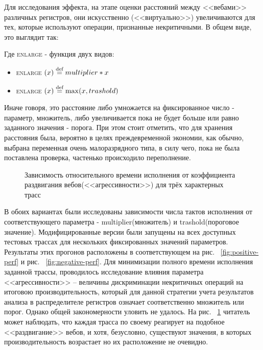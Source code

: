\documentclass[a4paper,12pt,titlepage]{article}
\newcommand*{\fig}[1]{рис. ~{\ref{fig:#1}}}
\begin{document}
Для исследования эффекта, на этапе оценки расстояний между <<вебами>> различных регистров, они искусственно (<<виртуально>>) увеличиваются для тех, которые используют операции, признанные некритичными. В общем виде, это выглядит так:
\begin{algorithmic}
\EndIf
\end{algorithmic}
Где \textsc{enlarge} - функция двух видов:
\begin{itemize}
	\item \textsc{enlarge} $( x ) \stackrel{\text{def}}{=} multiplier*x$
	\item \textsc{enlarge} $( x ) \stackrel{\text{def}}{=} \max(x, trashold)$
\end{itemize}
Иначе говоря, это расстояние либо умножается на фиксированное число - параметр, множитель, либо увеличивается пока не будет больше или равно заданного значения - порога. При этом стоит отметить, что для хранения расстояния была, вероятно в целях преждевременной экономии, как обычно, выбрана переменная очень малоразрядного типа, в силу чего, пока не была поставлена проверка, частенько происходило переполнение.
\begin{figure}[!h]

\caption{Зависимость относительного времени исполнения от коэффициента раздвигания вебов(<<агрессивности>>) для трёх характерных трасс}
\label{fig:impress}
\end{figure}

\pagebreak

В обоих вариантах были исследованы зависимости числа тактов исполнения от соответствующего параметра - multiplier(множитель) и trashold(пороговое значение). 
Модифицированные версии были запущены на всех доступных тестовых трассах для нескольких фиксированных значений параметров. Результаты этих прогонов расположены в соответствующем на \fig{positive-perf} и \fig{negative-perf}.
Для минимизации полного времени исполнения заданной трассы, проводилось исследование влияния параметра <<агрессивности>> -- величины дискриминации некритичных операций на итоговою производительность, который для данной стратегии учета результатов анализа в распределителе регистров означает соответственно множитель или порог. Однако общей закономерности уловить не удалось.
 На \fig{impress} читатель может наблюдать, что каждая трасса по своему реагирует на подобное <<раздвигание>> вебов, и хотя, безусловно, существуют значения, в которых производительность возрастает но их расположение не очевидно.
\end{document}
